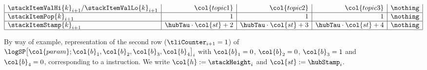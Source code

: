 \begin{figure}[h!]
\[\begin{array}{|l|r|r|r|c|}
	\stackItemValHi{k}_{i + 1} / \stackItemValLo{k}_{i + 1} & \col{topic1}                       & \col{topic2}                       & \col{topic3}                       & \nothing                           \\ \hline
	\stackItemPop{k}_{i + 1}                                & 1                                  & 1                                  & 1                                  & \nothing                           \\ \hline
	\stackItemStamp{k}_{i + 1}                              & \hubTau \cdot \col{st} + 2         & \hubTau \cdot \col{st} + 3         & \hubTau \cdot \col{st} + 4         & \nothing                           \\ \hline
	\end{array}	
\]
\caption{%
By way of example, representation of the second row ($\tliCounter_{i + 1} = 1$) of $\logSP\big[\col{param}; \col{b}_1, \col{b}_2, \col{b}_3, \col{b}_4\big]_{i}$ with
$\col{b}_1 = 0$,
$\col{b}_2 = 0$,
$\col{b}_3 = 1$ and
$\col{b}_4 = 0$,
corresponding to a  instruction.
We write $\col{h} := \stackHeight_{i}$ and $\col{st} := \hubStamp_{i}$.}
\end{figure}
